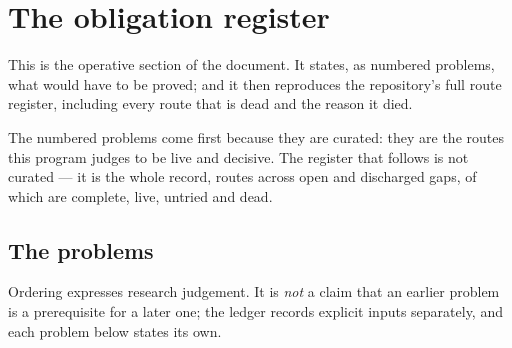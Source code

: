 \section{The obligation register}
\label{sec:obligations}

This is the operative section of the document. It states, as numbered
problems, what would have to be proved; and it then reproduces the
repository's full route register, including every route that is dead and
the reason it died.

The numbered problems come first because they are curated: they are the
routes this program judges to be live and decisive. The register that
follows is not curated --- it is the whole record, \RouteTotal{} routes
across \GapOpen{} open and \GapDischarged{} discharged gaps, of which
\RouteDone{} are complete, \RouteLive{} live, \RouteUntried{} untried and
\RouteDead{} dead.

\subsection{The problems}

Ordering expresses research judgement. It is \emph{not} a claim that an
earlier problem is a prerequisite for a later one; the ledger records
explicit inputs separately, and each problem below states its own.

